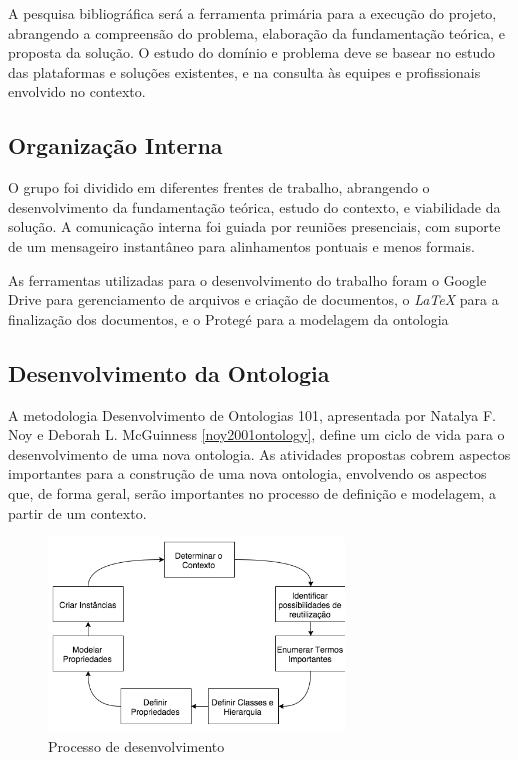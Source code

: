 
A pesquisa bibliográfica será a ferramenta primária para a execução do projeto, abrangendo a compreensão do problema, elaboração da fundamentação teórica, e proposta da solução. O estudo do domínio e problema deve se basear no estudo das plataformas e soluções existentes, e na consulta às equipes e profissionais envolvido no contexto.

\subsection{Organização Interna}

O grupo foi dividido em diferentes frentes de trabalho, abrangendo o desenvolvimento da fundamentação teórica, estudo do contexto, e viabilidade da solução. A comunicação interna foi guiada por reuniões presenciais, com suporte de um mensageiro instantâneo para alinhamentos pontuais e menos formais.

As ferramentas utilizadas para o desenvolvimento do trabalho foram o Google Drive para gerenciamento de arquivos e criação de documentos, o \textit{LaTeX} para a finalização dos documentos, e o Protegé para a modelagem da ontologia

\subsection{Desenvolvimento da Ontologia}

A metodologia Desenvolvimento de Ontologias 101, apresentada por Natalya F. Noy e Deborah L. McGuinness \ref{noy2001ontology}, define um ciclo de vida para o desenvolvimento de uma nova ontologia. As atividades propostas cobrem aspectos importantes para a construção de uma nova ontologia, envolvendo os aspectos que, de forma geral, serão importantes no processo de definição e modelagem, a partir de um contexto.

\begin{figure}[H]
	\centering
	\includegraphics[width=0.7\textwidth]{imagens/desenvolvimento}
	\caption{Processo de desenvolvimento}
	\label{img:desenvolvimento}
\end{figure}

